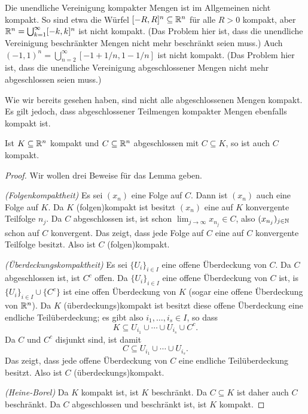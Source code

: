 \documentclass[a4paper,10pt]{article}
\begin{document}
\begin{bem}
 Die unendliche Vereinigung kompakter Mengen ist im Allgemeinen nicht kompakt. So sind etwa die Würfel $[-R, R]^n \subseteq \mathbb{R}^n$ für alle $R > 0$ kompakt, aber $\mathbb{R}^n = \bigcup_{k=1}^\infty [-k,k]^n$ ist nicht kompakt. (Das Problem hier ist, dass die unendliche Vereinigung beschränkter Mengen nicht mehr beschränkt seien muss.) Auch $(-1,1)^n = \bigcup_{n=2}^\infty [-1+1/n, 1-1/n]$ ist nicht kompakt. (Das Problem hier ist, dass die unendliche Vereinigung abgeschlossener Mengen nicht mehr abgeschlossen seien muss.)
\end{bem}


Wie wir bereits gesehen haben, sind nicht alle abgeschlossenen Mengen kompakt. Es gilt jedoch, dass abgeschlossener Teilmengen kompakter Mengen ebenfalls kompakt ist.


\begin{lem}\label{lem: abgeschlossen Teilmengen von kompakten Mengen}
 Ist $K \subseteq \mathbb{R}^n$ kompakt und $C \subseteq \mathbb{R}^n$ abgeschlossen mit $C \subseteq K$, so ist auch $C$ kompakt.
\end{lem}
\begin{proof}
 Wir wollen drei Beweise für das Lemma geben.
 
 \emph{(Folgenkompaktheit)} Es sei $(x_n)$ eine Folge auf $C$. Dann ist $(x_n)$ auch eine Folge auf $K$. Da $K$ (folgen)kompakt ist besitzt $(x_n)$ eine auf $K$ konvergente Teilfolge $n_j$. Da $C$ abgeschlossen ist, ist schon $\lim_{j \to \infty} x_{n_j} \in C$, also $(x_{n_j})_{j \in \mathbb{N}}$ schon auf $C$ konvergent. Das zeigt, dass jede Folge auf $C$ eine auf $C$ konvergente Teilfolge besitzt. Also ist $C$ (folgen)kompakt.
 
 \emph{(Überdeckungskompaktheit)} Es sei $\{U_i\}_{i \in I}$ eine offene Überdeckung von $C$. Da $C$ abgeschlossen ist, ist $C^c$ offen. Da $\{U_i\}_{i \in I}$ eine offene Überdeckung von $C$ ist, is $\{U_i\}_{i \in I} \cup \{C^c\}$ ist eine offen Überdeckung von $K$ (sogar eine offene Überdeckung von $\mathbb{R}^n$). Da $K$ (überdeckungs)kompakt ist besitzt diese offene Überdeckung eine endliche Teilüberdeckung; es gibt also $i_1, \dotsc, i_s \in I$, so dass
 \[
  K \subseteq U_{i_1} \cup \dotsb \cup U_{i_s} \cup C^c.
 \]
 Da $C$ und $C^c$ disjunkt sind, ist damit
 \[
  C \subseteq U_{i_1} \cup \dotsb \cup U_{i_s}.
 \]
 Das zeigt, dass jede offene Überdeckung von $C$ eine endliche Teilüberdeckung besitzt. Also ist $C$ (überdeckungs)kompakt.
 
 \emph{(Heine-Borel)} Da $K$ kompakt ist, ist $K$ beschränkt. Da $C \subseteq K$ ist daher auch $C$ beschränkt. Da $C$ abgeschlossen und beschränkt ist, ist $K$ kompakt.
\end{proof}
\end{document}
